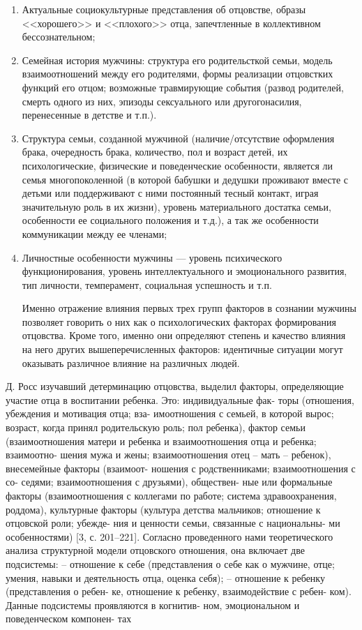 \documentclass{../../common/thesisbyxetex}
\begin{document}
\begin{enumerate}
	\item Актуальные социокультурные представления об отцовстве, образы <<хорошего>> и <<плохого>>
отца, запечтленные в коллективном бессознательном;

    \item Семейная история мужчины: структура его родительсткой семьи,  модель взаимоотношений
между его родителями, формы реализации отцовстких функций его отцом; возможные травмирующие события
(развод родителей, смерть одного из них, эпизоды сексуального или другогонасилия, перенесенные в
детстве и т.п.).

	\item Структура семьи, созданной мужчиной (наличие/отсутствие оформления брака,
очередность брака, количество, пол и возраст детей, их психологические, физические и
поведенческие особенности, является ли семья многопоколенной (в которой бабушки и дедушки
проживают вместе с детьми или поддерживают с ними постоянный тесный контакт, играя
значительную роль в их жизни), уровень материального достатка семьи, особенности ее социального
положения и т.д.), а так же  особенности коммуникации между ее членами;

	\item Личностные особенности мужчины --- уровень психического функционирования,
уровень интеллектуального и эмоционального развития, тип личности, темперамент, социальная
успешность и т.п.

Именно отражение влияния первых трех групп факторов в сознании мужчины позволяет говорить о них как
о психологических факторах формирования отцовства. Кроме того, именно они определяют степень и
качество влияния на него других вышеперечисленных факторов: идентичные ситуации могут оказывать
различное влияние на различных людей.
\end{enumerate}

Д. Росс изучавший детерминацию отцовства,
выделил факторы, определяющие участие отца
в воспитании ребенка. Это: индивидуальные фак-
торы (отношения, убеждения и мотивация отца; вза-
имоотношения с семьей, в которой вырос; возраст,
когда принял родительскую роль; пол ребенка),
фактор семьи (взаимоотношения матери и ребенка
и взаимоотношения отца и ребенка; взаимоотно-
шения мужа и жены; взаимоотношения отец –
мать – ребенок), внесемейные факторы (взаимоот-
ношения с родственниками; взаимоотношения с со-
седями; взаимоотношения с друзьями), обществен-
ные или формальные факторы (взаимоотношения
с коллегами по работе; система здравоохранения,
роддома), культурные факторы (культура детства
мальчиков; отношение к отцовской роли; убежде-
ния и ценности семьи, связанные с национальны-
ми особенностями) [3, с. 201–221].
Согласно проведенного нами теоретического
анализа структурной модели отцовского отношения,
она включает две подсистемы:
– отношение к себе (представления о себе как
о мужчине, отце; умения, навыки и деятельность
отца, оценка себя);
– отношение к ребенку (представления о ребен-
ке, отношение к ребенку, взаимодействие с ребен-
ком).
Данные подсистемы проявляются в когнитив-
ном, эмоциональном и поведенческом компонен-
тах \cite[40]{otage}
\end{document}
